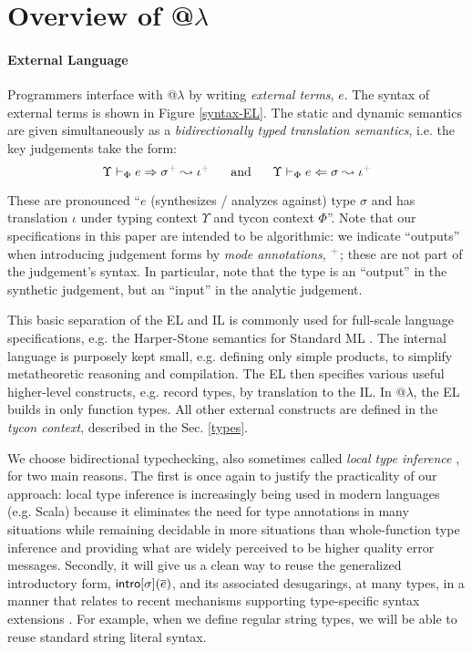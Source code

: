 \documentclass[10pt,preprint]{sigplanconf}
\newcommand{\moutput}{^{\color{gray}+}}
\begin{document}
\section{Overview of @$\lambda$}\label{atlam}\label{overview}
\paragraph{External Language}
Programmers interface with @$\lambda$ by writing \emph{external terms}, $e$. The syntax of external terms is shown in Figure \ref{syntax-EL}. %
The static and dynamic semantics are given simultaneously as a \emph{bidirectionally typed translation semantics}, i.e. the key judgements take the form:  \[\esynX{e}{\st\moutput}{\iota\moutput} ~~~~~\text{and}~~~~~ \eanaX{e}{\st}{\iota\moutput}\]
\noindent

These are pronounced ``$e$ (synthesizes / analyzes against) type $\sigma$ and has  translation $\iota$ under typing context $\Upsilon$ and tycon context $\Phi$''. Note that our specifications in this paper are intended to be algorithmic: we indicate ``outputs'' when introducing judgement forms by \emph{mode annotations}, $\moutput$; these are not part of the judgement's syntax. In particular, note that the type is an ``output'' in the synthetic judgement, but an ``input'' in  the analytic judgement.

This basic separation of the EL and IL is commonly used for full-scale language specifications, e.g. the Harper-Stone semantics for Standard ML \cite{Harper00atype-theoretic}. The internal language is purposely kept small, e.g. defining only simple products, to simplify metatheoretic reasoning and compilation. The EL then specifies various useful higher-level constructs, e.g. record types, by translation to the IL. In @$\lambda$, the EL builds in only function types. All other external constructs are defined in the \emph{tycon context}, described in the Sec. \ref{types}. 

We choose bidirectional typechecking, also sometimes called \emph{local type inference} \cite{Pierce:2000:LTI:345099.345100}, for two main reasons. The first is once again to justify the practicality of our approach: local type inference is increasingly being used in modern languages (e.g. Scala) because it eliminates the need for type annotations in many situations while remaining decidable in more situations than whole-function type inference and providing what are widely perceived to be higher quality error messages. Secondly, it will give us a clean way to reuse the generalized introductory form, ${\sf intro}[\sigma](\overline{e})$, and its associated desugarings, at many types, in a manner that relates to recent mechanisms supporting type-specific syntax extensions \cite{TSLs}. For example, when we define regular string types, we will be able to reuse standard string literal syntax. 
\end{document}

